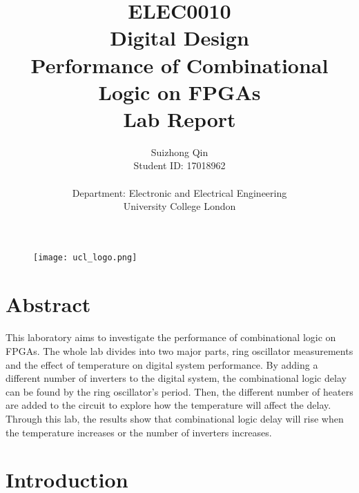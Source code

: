 \documentclass[12pt]{article}
\title{ELEC0010 \\Digital Design\\Performance of Combinational Logic on FPGAs\\Lab Report}
\author{Suizhong Qin \\Student ID: 17018962 \\\\ Department: Electronic and Electrical Engineering \\ University College London}
\begin{document}
    \begin{figure}[t] %
    \centering
    \texttt{[image: ucl\_logo.png]}
    \end{figure}
    \maketitle
    \thispagestyle{empty}
    

    \newpage
    \tableofcontents
    \thispagestyle{empty}
    \setcounter{page}{0}
    
    \newpage
    \pagestyle{plain}
    \section{Abstract}
    \paragraph{}
    This laboratory aims to investigate the performance of combinational logic on FPGAs. The whole lab divides into two major parts, ring oscillator measurements and the effect of temperature on digital system performance. By adding a different number of inverters to the digital system, the combinational logic delay can be found by the ring oscillator's period. Then, the different number of heaters are added to the circuit to explore how the temperature will affect the delay. Through this lab, the results show that  combinational logic delay will rise when the temperature increases or the number of inverters increases.
    
    \section{Introduction}
\end{document}
